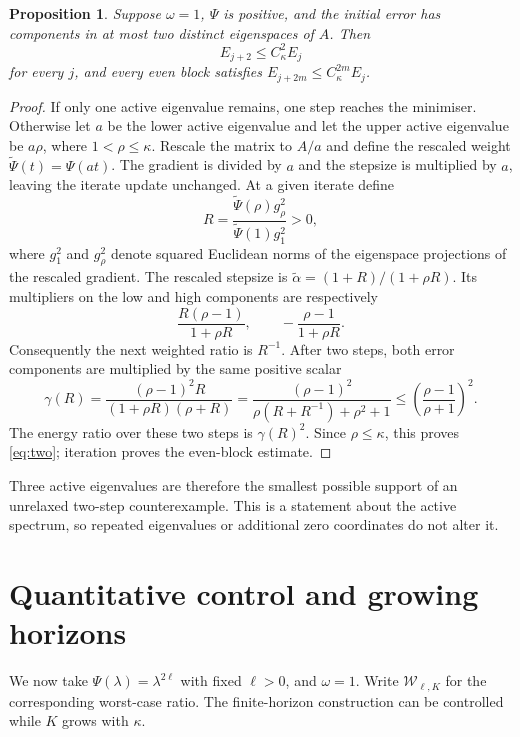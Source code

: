 \documentclass[11pt,a4paper]{article}
\newtheorem{proposition}[theorem]{Proposition}
\theoremstyle{remark}
\newcommand{\W}{\mathcal W}
\newcommand{\Ck}{C_\kappa}
\begin{document}
\begin{proposition}\label{prop:two}
Suppose $\omega=1$, $\Psi$ is positive, and the initial error has components in at most two distinct eigenspaces of $A$. Then
\begin{equation}\label{eq:two}
 E_{j+2}\le\Ck^2 E_j
\end{equation}
for every $j$, and every even block satisfies $E_{j+2m}\le\Ck^{2m}E_j$.
\end{proposition}
\begin{proof}
If only one active eigenvalue remains, one step reaches the minimiser. Otherwise let $a$ be the lower active eigenvalue and let the upper active eigenvalue be $a\rho$, where $1<\rho\le\kappa$. Rescale the matrix to $A/a$ and define the rescaled weight $\widetilde\Psi(t)=\Psi(at)$. The gradient is divided by $a$ and the stepsize is multiplied by $a$, leaving the iterate update unchanged. At a given iterate define
\[
 R=\frac{\widetilde\Psi(\rho)g_{\rho}^2}{\widetilde\Psi(1)g_1^2}>0,
\]
where $g_1^2$ and $g_\rho^2$ denote squared Euclidean norms of the eigenspace projections of the rescaled gradient. The rescaled stepsize is $\widetilde\alpha=(1+R)/(1+\rho R)$. Its multipliers on the low and high components are respectively
\[
 \frac{R(\rho-1)}{1+\rho R},\qquad
 -\frac{\rho-1}{1+\rho R}.
\]
Consequently the next weighted ratio is $R^{-1}$. After two steps, both error components are multiplied by the same positive scalar
\[
 \gamma(R)=\frac{(\rho-1)^2R}{(1+\rho R)(\rho+R)}
 =\frac{(\rho-1)^2}{\rho(R+R^{-1})+\rho^2+1}
 \le\left(\frac{\rho-1}{\rho+1}\right)^2.
\]
The energy ratio over these two steps is $\gamma(R)^2$. Since $\rho\le\kappa$, this proves \eqref{eq:two}; iteration proves the even-block estimate.
\end{proof}

Three active eigenvalues are therefore the smallest possible support of an unrelaxed two-step counterexample. This is a statement about the active spectrum, so repeated eigenvalues or additional zero coordinates do not alter it.

\section{Quantitative control and growing horizons}

We now take $\Psi(\lambda)=\lambda^{2\ell}$ with fixed $\ell>0$, and $\omega=1$. Write $\W_{\ell,K}$ for the corresponding worst-case ratio. The finite-horizon construction can be controlled while $K$ grows with $\kappa$.
\end{document}

